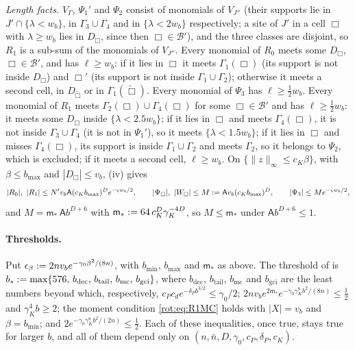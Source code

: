 \emph{Length facts.} $V_\Gamma$, $\Psi_1'$ and $\Psi_2$ consist of monomials of $V_{J''}$ (their supports lie in $J'\cap\{\lambda<w_b\}$, in $\Gamma_3\cup\Gamma_4$ and in $\{\lambda<2w_b\}$ respectively; a site of $J'$ in a cell $\Box$ with $\lambda\ge w_b$ lies in $D_\Box$, since then $\Box\in\mathcal B'$), and the three classes are disjoint, so $R_1$ is a sub-sum of the monomials of $V_{J''}$. Every monomial of $R_0$ meets some $D_\Box$, $\Box\in\mathcal B'$, and has $\ell\ge w_b$: if it lies in $\Box$ it meets $\Gamma_1(\Box)$ (its support is not inside $D_\Box$) and $\Box'$ (its support is not inside $\Gamma_1\cup\Gamma_2$); otherwise it meets a second cell, in $D_{\tilde\Box}$ or in $\Gamma_1(\tilde\Box)$. Every monomial of $\Psi_3$ has $\ell\ge\frac12w_b$. Every monomial of $R_1$ meets $\Gamma_2(\Box)\cup\Gamma_4(\Box)$ for some $\Box\in\mathcal B'$ and has $\ell\ge\frac12w_b$: it meets some $D_\Box$ inside $\{\lambda<2.5w_b\}$; if it lies in $\Box$ and meets $\Gamma_4(\Box)$, it is not inside $\Gamma_3\cup\Gamma_4$ (it is not in $\Psi_1'$), so it meets $\{\lambda<1.5w_b\}$; if it lies in $\Box$ and misses $\Gamma_4(\Box)$, its support is inside $\Gamma_1\cup\Gamma_2$ and meets $\Gamma_2$, so it belongs to $\Psi_2$, which is excluded; if it meets a second cell, $\ell\ge w_b$. On $\{\|z\|_\infty\le c_K\beta\}$, with $\beta\le b_{\max}$ and $|D_\Box|\le v_b$, (iv) gives
\[
|R_0|,\ |R_1|\le N'v_b\mathsf A(c_Kb_{\max})^De^{-\varsigma w_b/2},\qquad|\Psi_\Box|,\ |W_\Box|\le M:=\mathsf Av_b(c_Kb_{\max})^D,\qquad|\Psi_3|\le Me^{-\varsigma w_b/2},
\]
and $M=\mathsf m_*\,\mathsf Ab^{D+6}$ with $\mathsf m_*:=64\,c_K^D\gamma_K^{-4D}$, so $M\le\mathsf m_*$ under $\mathsf Ab^{D+6}\le1$.

\paragraph{Thresholds.} Put $\epsilon_\beta:=2nv_be^{-\gamma_0\beta^2/(8n)}$, with $b_{\min}$, $b_{\max}$ and $\mathsf m_*$ as above. The threshold of  is $b_*:=\max\{576,\,b_{\mathrm{dec}},\,b_{\mathrm{tail}},\,b_{\mathrm{mc}},\,b_{\mathrm{gci}}\}$, where $b_{\mathrm{dec}}$, $b_{\mathrm{tail}}$, $b_{\mathrm{mc}}$ and $b_{\mathrm{gci}}$ are the least numbers beyond which, respectively, $c_Pc_de^{-\delta_Pb^{3/2}}\le\gamma_0/2$; $2nv_be^{2\mathsf m_*}e^{-\gamma_0\gamma_K^8b^2/(8n)}\le\frac12$ and $\gamma_K^4b\ge2$; the moment condition \eqref{rot:eq:R1MC} holds with $|X|=v_b$ and $\beta=b_{\min}$; and $2e^{-\gamma_0\gamma_K^8b^2/(2n)}\le\frac12$. Each of these inequalities, once true, stays true for larger $b$, and all of them depend only on $(n,\bar n,D,\gamma_0,c_P,\delta_P,c_K)$.

